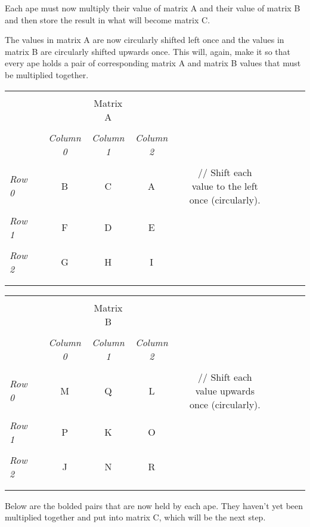\documentclass[10pt]{article}
\begin{document}
Each ape must now multiply their value of matrix A and their value of matrix B and then store the result in what will become matrix C. \par
The values in matrix A are now circularly shifted left once and the values in matrix B are circularly shifted upwards once.  This will, again, make it so that every ape holds a pair of corresponding matrix A and matrix B values that must be multiplied together. \par

\begin{tabular}{l*{9}{c}r}
  \\
  \\
  & & & Matrix A \\
  \\
  & &
  \textit{Column 0} &
  \textit{Column 1} &
  \textit{Column 2} & \\
  \\
  \textit{Row 0} & & B & C & A && // Shift each value to the left once (circularly).\\
  \\
  \textit{Row 1} & & F & D & E \\
  \\
  \textit{Row 2} & & G & H & I \\
  \\
  \\
\end{tabular}

\begin{tabular}{l*{9}{c}r}
  \\
  \\
  & & & Matrix B \\
  \\
  & &
  \textit{Column 0} &
  \textit{Column 1} &
  \textit{Column 2} & \\
  \\
  \textit{Row 0} & & M & Q & L && // Shift each value upwards once (circularly).\\
  \\
  \textit{Row 1} & & P & K & O \\
  \\
  \textit{Row 2} & & J & N & R \\
  \\
  \\
\end{tabular}

Below are the bolded pairs that are now held by each ape.  They haven't yet been multiplied together and put into matrix C, which will be the next step.\par
\end{document}

